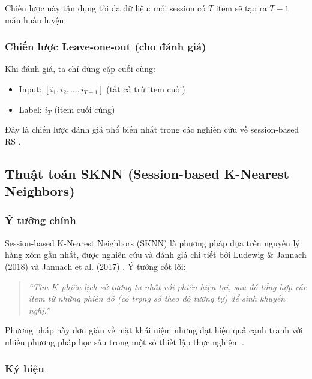 \documentclass[12pt, a4paper]{article}
\begin{document}
Chiến lược này tận dụng tối đa dữ liệu: mỗi session có $T$ item sẽ tạo ra $T-1$ mẫu huấn luyện.

\subsubsection{Chiến lược Leave-one-out (cho đánh giá)}

Khi đánh giá, ta chỉ dùng cặp cuối cùng:
\begin{itemize}
    \item Input: $[i_1, i_2, \ldots, i_{T-1}]$ (tất cả trừ item cuối)
    \item Label: $i_T$ (item cuối cùng)
\end{itemize}

Đây là chiến lược đánh giá phổ biến nhất trong các nghiên cứu về session-based RS \cite{ludewig2018, hidasi2016}.


\subsection{Thuật toán SKNN (Session-based K-Nearest Neighbors)}

\subsubsection{Ý tưởng chính}

Session-based K-Nearest Neighbors (SKNN) là phương pháp dựa trên nguyên lý hàng xóm gần nhất, được nghiên cứu và đánh giá chi tiết bởi Ludewig \& Jannach (2018) \cite{ludewig2018} và Jannach et al. (2017) \cite{jannach2017}. Ý tưởng cốt lõi:

\begin{quote}
\textit{``Tìm $K$ phiên lịch sử tương tự nhất với phiên hiện tại, sau đó tổng hợp các item từ những phiên đó (có trọng số theo độ tương tự) để sinh khuyến nghị.''}
\end{quote}

Phương pháp này đơn giản về mặt khái niệm nhưng đạt hiệu quả cạnh tranh với nhiều phương pháp học sâu trong một số thiết lập thực nghiệm \cite{ludewig2018}.

\subsubsection{Ký hiệu}
\end{document}
